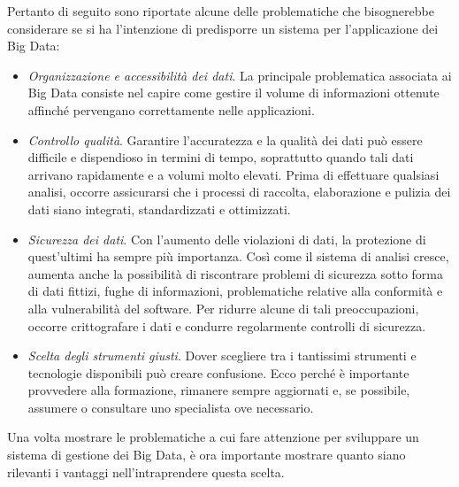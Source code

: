 Pertanto di seguito sono riportate alcune delle problematiche che bisognerebbe considerare se si ha l'intenzione di predisporre un sistema per l'applicazione dei Big Data\cite{microsoft_big_data}:

\begin{itemize}
    \item \textit{Organizzazione e accessibilità dei dati}. La principale problematica associata ai Big Data consiste nel capire come gestire il volume di informazioni ottenute affinché pervengano correttamente nelle applicazioni.
    \item \textit{Controllo qualità}. Garantire l'accuratezza e la qualità dei dati può essere difficile e dispendioso in termini di tempo, soprattutto quando tali dati arrivano rapidamente e a volumi molto elevati. Prima di effettuare qualsiasi analisi, occorre assicurarsi che i processi di raccolta, elaborazione e pulizia dei dati siano integrati, standardizzati e ottimizzati.
    \item \textit{Sicurezza dei dati}. Con l'aumento delle violazioni di dati, la protezione di quest'ultimi ha sempre più importanza. Così come il sistema di analisi cresce, aumenta anche la possibilità di riscontrare problemi di sicurezza sotto forma di dati fittizi, fughe di informazioni, problematiche relative alla conformità e alla vulnerabilità del software. Per ridurre alcune di tali preoccupazioni, occorre crittografare i dati e condurre regolarmente controlli di sicurezza.
    \item \textit{Scelta degli strumenti giusti}. Dover scegliere tra i tantissimi strumenti e tecnologie disponibili può creare confusione. Ecco perché è importante provvedere alla formazione, rimanere sempre aggiornati e, se possibile, assumere o consultare uno specialista ove necessario.
\end{itemize}

Una volta mostrare le problematiche a cui fare attenzione per sviluppare un sistema di gestione dei Big Data, è ora importante mostrare quanto siano rilevanti i vantaggi nell'intraprendere questa scelta.\cite{oracle_big_data}

